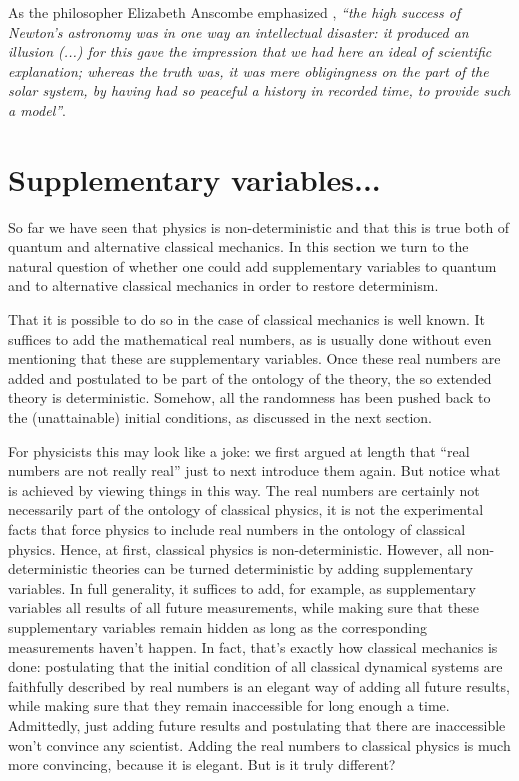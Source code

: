 \documentclass[pra,aps,groupedaddress,twocolumn,floatfix,nofootinbib]{revtex4}
\begin{document}
As the philosopher Elizabeth Anscombe emphasized \cite{Anscombe}, {\it ``the high success of Newton’s astronomy was in one way an intellectual disaster: it produced an illusion (...) for this gave the impression that we had here an ideal of scientific explanation; whereas the truth was, it was mere obligingness on the part of the solar system, by having had so peaceful a history in recorded time, to provide such a model''}.


\section{Supplementary variables...}\label{suppvar}
So far we have seen that physics is non-deterministic and that this is true both of quantum \cite{GisinQchance14} and alternative classical mechanics. In this section we turn to the natural question of whether one could add supplementary variables to quantum and to alternative classical mechanics in order to restore determinism. 

That it is possible to do so in the case of classical mechanics is well known. It suffices to add the mathematical real numbers, as is usually done without even mentioning that these are supplementary variables. Once these real numbers are added and postulated to be part of the ontology of the theory, the so extended theory is deterministic. Somehow, all the randomness has been pushed back to the (unattainable) initial conditions, as discussed in the next section. 

For physicists this may look like a joke: we first argued at length that "`real numbers are not really real"' just to next introduce them again. But notice what is achieved by viewing things in this way. The real numbers are certainly not necessarily part of the ontology of classical physics, it is not the experimental facts that force physics to include real numbers in the ontology of classical physics. Hence, at first, classical physics is non-deterministic. However, all non-deterministic theories can be turned deterministic by adding supplementary variables. In full generality, it suffices to add, for example, as supplementary variables all results of all future measurements, while making sure that these supplementary variables remain hidden as long as the corresponding measurements haven't happen. In fact, that's exactly how classical mechanics is done: postulating that the initial condition of all classical dynamical systems are faithfully described by real numbers is an elegant way of adding all future results, while making sure that they remain inaccessible for long enough a time. Admittedly, just adding future results and postulating that there are inaccessible won't convince any scientist. Adding the real numbers to classical physics is much more convincing, because it is elegant. But is it truly different? 
\end{document}
